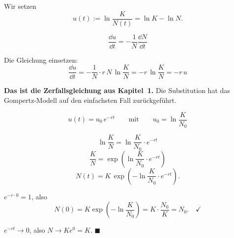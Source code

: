 \begin{merksatz}
Wir setzen
\[ u(t) := \ln\frac{K}{N(t)} = \ln K - \ln N . \]

\[ \frac{\dd u}{\dd t} = -\frac{1}{N}\frac{\dd N}{\dd t} \]

Die Gleichung einsetzen:
\[ \frac{\dd u}{\dd t} = -\frac{1}{N}\cdot r\,N\,\ln\frac{K}{N} = -r\,\ln\frac{K}{N} = -r\,u \]

\begin{center}
\begin{minipage}{0.9\textwidth}
\textbf{Das ist die Zerfallsgleichung aus Kapitel~1.} Die Substitution hat das Gompertz-Modell auf den einfachsten Fall zurückgeführt.
\end{minipage}
\end{center}

\[ u(t) = u_0\,e^{-rt} \qquad\text{mit}\qquad u_0 = \ln\frac{K}{N_0} \]

\[ \ln\frac{K}{N} = \ln\frac{K}{N_0}\cdot e^{-rt} \]
\[ \frac{K}{N} = \exp\left(\ln\frac{K}{N_0}\cdot e^{-rt}\right) \]
\[ N(t) = K\,\exp\left(-\ln\frac{K}{N_0}\cdot e^{-rt}\right) . \]

 $e^{-r\cdot0} = 1$, also
\[ N(0) = K\exp\left(-\ln\frac{K}{N_0}\right) = K\cdot\frac{N_0}{K} = N_0 . \quad \checkmark \]

 $e^{-rt} \to 0$, also $N \to K e^{0} = K$. \checkmark $\blacksquare$

\begin{center}
\begin{minipage}{0.88\textwidth}
\end{minipage}
\end{center}
\end{merksatz}

